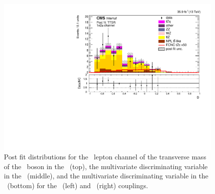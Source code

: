 \begin{figure}[htbp]
	\includegraphics[width=0.49\linewidth]{6_Search/Figures/ZctFit/shapes_fit_s_LepChan_1e2mu_TTSR_error_trial.pdf}
	\caption{Post fit distributions for the \emumu\ lepton channel of the transverse mass of the \PW\ boson in the \WZCR\ (top), the multivariate discriminating variable in the \STSR\ (middle), and the multivariate discriminating variable in the \TTSR\ (bottom) for the \Zut\ (left) and \Zct\ (right) couplings. }
	\label{fig:shapesfit1e2mu}
\end{figure}

